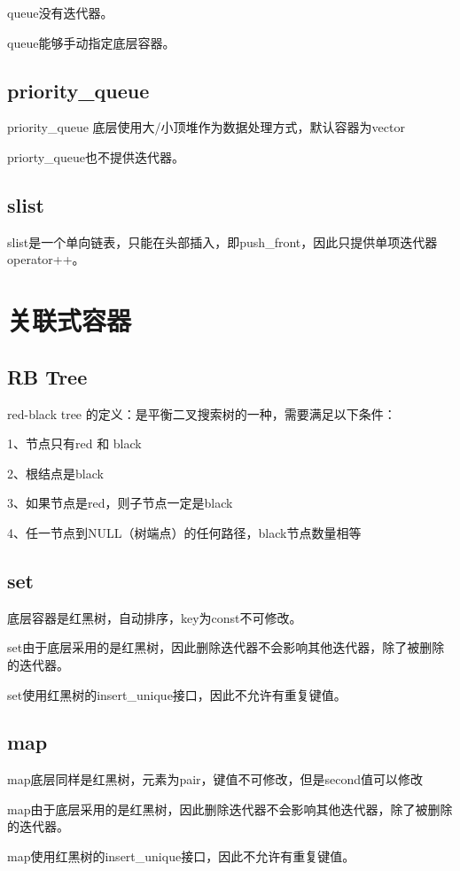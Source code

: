 \documentclass[a4paper,fontset=mac]{ctexart}
\begin{document}
	queue没有迭代器。
	
	queue能够手动指定底层容器。
	
	\subsection{priority\_queue}
	priority\_queue 底层使用大/小顶堆作为数据处理方式，默认容器为vector
	
	priorty\_queue也不提供迭代器。
	
	\subsection{slist}
	slist是一个单向链表，只能在头部插入，即push\_front，因此只提供单项迭代器operator++。
	
	
	\section{关联式容器}
	\subsection{RB Tree}
	red-black tree 的定义：是平衡二叉搜索树的一种，需要满足以下条件：
	
	1、节点只有red 和 black
	
	2、根结点是black
	
	3、如果节点是red，则子节点一定是black
	
	4、任一节点到NULL（树端点）的任何路径，black节点数量相等
	
	\subsection{set}
	底层容器是红黑树，自动排序，key为const不可修改。
	
	set由于底层采用的是红黑树，因此删除迭代器不会影响其他迭代器，除了被删除的迭代器。
	
	set使用红黑树的insert\_unique接口，因此不允许有重复键值。
	
	\subsection{map}
	map底层同样是红黑树，元素为pair，键值不可修改，但是second值可以修改
	
	map由于底层采用的是红黑树，因此删除迭代器不会影响其他迭代器，除了被删除的迭代器。
	
	map使用红黑树的insert\_unique接口，因此不允许有重复键值。
	
\end{document}
